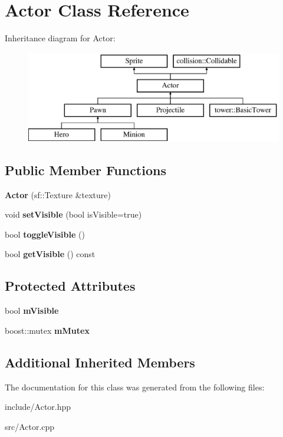 \hypertarget{class_actor}{}\section{Actor Class Reference}
\label{class_actor}
Inheritance diagram for Actor\+:\begin{figure}[H]
\begin{center}
\leavevmode
\includegraphics[height=4.000000cm]{class_actor}
\end{center}
\end{figure}
\subsection*{Public Member Functions}
\begin{DoxyCompactItemize}
\item 
\hypertarget{class_actor_a4a5f835c6cb76df32d6d7bee8adfa578}{}{\bfseries Actor} (sf\+::\+Texture \&texture)\label{class_actor_a4a5f835c6cb76df32d6d7bee8adfa578}

\item 
\hypertarget{class_actor_a3d3e6e2264a2ab940fd652329d9f92fb}{}void {\bfseries set\+Visible} (bool is\+Visible=true)\label{class_actor_a3d3e6e2264a2ab940fd652329d9f92fb}

\item 
\hypertarget{class_actor_aacf2f1a5e7758373f14e1bb2ba30bf08}{}bool {\bfseries toggle\+Visible} ()\label{class_actor_aacf2f1a5e7758373f14e1bb2ba30bf08}

\item 
\hypertarget{class_actor_af41b5a4e7b75abccda84648bb2539bd7}{}bool {\bfseries get\+Visible} () const \label{class_actor_af41b5a4e7b75abccda84648bb2539bd7}

\end{DoxyCompactItemize}
\subsection*{Protected Attributes}
\begin{DoxyCompactItemize}
\item 
\hypertarget{class_actor_a189eba290bff18e57ca29a638f807ff0}{}bool {\bfseries m\+Visible}\label{class_actor_a189eba290bff18e57ca29a638f807ff0}

\item 
\hypertarget{class_actor_a3515de0782a3532d5af19daaf7d82fe3}{}boost\+::mutex {\bfseries m\+Mutex}\label{class_actor_a3515de0782a3532d5af19daaf7d82fe3}

\end{DoxyCompactItemize}
\subsection*{Additional Inherited Members}


The documentation for this class was generated from the following files\+:\begin{DoxyCompactItemize}
\item 
include/Actor.\+hpp\item 
src/Actor.\+cpp\end{DoxyCompactItemize}
